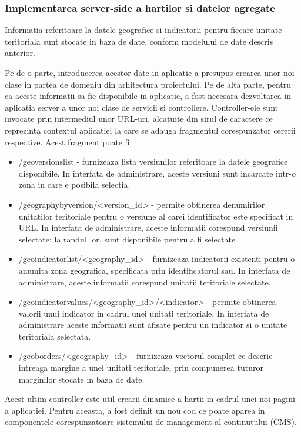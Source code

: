 \documentclass[a4paper, 10pt]{article}
\begin{document}
{\subsubsection{Implementarea server-side a hartilor si datelor agregate}

Informatia referitoare la datele geografice si indicatorii pentru fiecare unitate teritoriala sunt stocate in baza de date, conform modelului de date descris anterior. 

Pe de o parte, introducerea acestor date in aplicatie a presupus crearea unor noi clase in partea de domeniu din arhitectura proiectului. 
Pe de alta parte, pentru ca aceste informatii sa fie disponibile in aplicatie, a fost necesara dezvoltarea in aplicatia server a unor noi clase de servicii si controllere. 
Controller-ele sunt invocate prin intermediul unor URL-uri, alcatuite din sirul de caractere ce reprezinta contextul aplicatiei la care se adauga fragmentul corespunzator cererii respective. 
Acest fragment poate fi:
\begin{itemize}
\item
/geoversionslist - furnizeaza lista versiunilor referitoare la datele geografice disponibile. 
In interfata de administrare, aceste versiuni sunt incarcate intr-o zona in care e posibila selectia.
\item
/geographybyversion/<version\_id> - permite obtinerea denumirilor unitatilor teritoriale pentru o versiune al carei identificator este specificat in URL. 
In interfata de administrare, aceste informatii corespund versiunii selectate; la randul lor, sunt disponibile pentru a fi selectate. 
\item
/geoindicatorlist/<geography\_id> - furnizeaza indicatorii existenti pentru o anumita zona geografica, specificata prin identificatorul sau. 
In interfata de administrare, aceste informatii corespund unitatii teritoriale selectate.
\item
/geoindicatorvalues/<geography\_id>/<indicator> - permite obtinerea valorii unui indicator in cadrul unei unitati teritoriale. 
In interfata de administrare aceste informatii sunt afisate pentru un indicator si o unitate teritoriala selectata.
\item
/geoborders/<geography\_id> - furnizeaza vectorul complet ce descrie intreaga margine a unei unitati teritoriale, prin compunerea tuturor marginilor stocate in baza de date. 
\end{itemize}

\newpage
\clearpage
Acest ultim controller este util crearii dinamice a hartii in cadrul unei noi pagini a aplicatiei. 
Pentru aceasta, a fost definit un nou cod ce poate aparea in componentele corespunzatoare sistemului de management al continutului (CMS). 

}
\end{document}

